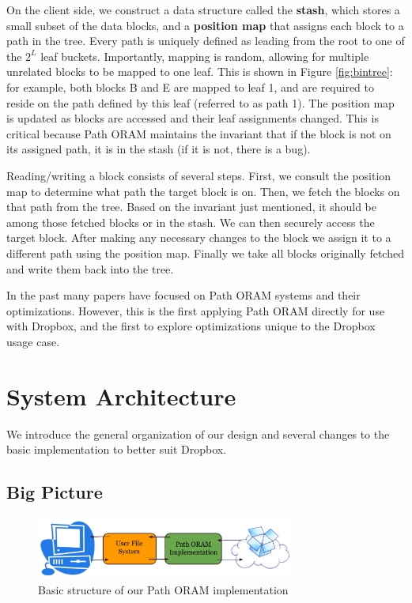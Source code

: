 \documentclass[conference]{IEEEtran}
\begin{document}
On the client side, we construct a data structure called the {\bf stash}, which stores a small subset of the data blocks, and a {\bf position map} that assigns each block to a path in the tree. Every path is uniquely defined as leading from the root to one of the $2^L$ leaf buckets. Importantly, mapping is random, allowing for multiple unrelated blocks to be mapped to one leaf. This is shown in Figure \ref{fig:bintree}: for example, both blocks B and E are mapped to leaf 1, and are required to reside on the path defined by this leaf (referred to as path 1). The position map is updated as blocks are accessed and their leaf assignments changed. This is critical because Path ORAM maintains the invariant that if the block is not on its assigned path, it is in the stash (if it is not, there is a bug).

Reading/writing a block consists of several steps. First, we consult the position map to determine what path the target block is on. Then, we fetch the blocks on that path from the tree. Based on the invariant just mentioned, it should be among those fetched blocks or in the stash. We can then securely access the target block. After making any necessary changes to the block we assign it to a different path using the position map. Finally we take all blocks originally fetched and write them back into the tree.

In the past many papers have focused on Path ORAM systems and their optimizations. However, this is the first applying Path ORAM directly for use with Dropbox, and the first to explore optimizations unique to the Dropbox usage case.



\section{System Architecture}

\label{sec:SysArch}
We introduce the general organization of our design and several changes to the basic implementation to better suit Dropbox.

\subsection{Big Picture}

\begin{figure}
\begin{center}
  \noindent\includegraphics[width=8.5cm]{310.pdf}
  \caption{Basic structure of our Path ORAM implementation}
  \label{fig:metadiag}
\end{center}
\end{figure}
\end{document}
